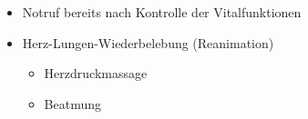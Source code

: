 %
\label{m:ehi-atem-kreislaufstillstand}
\begin{itemize}
  \item Notruf bereits nach Kontrolle der Vitalfunktionen
  \item Herz-Lungen-Wiederbelebung (Reanimation)
  \begin{itemize}
    \item Herzdruckmassage
    \item Beatmung
  \end{itemize}
\end{itemize}
